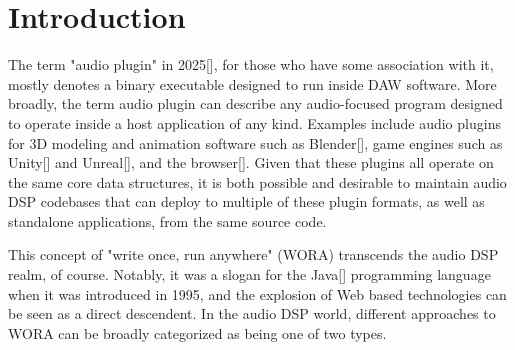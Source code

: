 \documentclass[a4paper]{article}
\title{\papertitle}
\affiliation{
\paperauthorA}
{\href{https://www.mat.ucsb.edu/}{Department of Media Arts \& Technology} \\
\href{https://www.ucsb.edu}{University of California Santa Barbara, USA} \\
{\tt \href{mailto:joel@jaffesd.com}{joel@jaffesd.com}}
}
\newif\ifpdf
\begin{document}
\ifpdf %
  \DeclareGraphicsExtensions{.png,.jpg,.pdf}
\else  %
\fi

\maketitle

\begin{abstract}
This paper introduces a novel plugin architecture, the LPA (Light-weight Plugin Architecture) plugin. 
The development of such an architecture is motivated by the expansive, duplicitous scope of existing audio plugin architectures, which are narrowly focused on deployment in DAW[] software. 
In contrast, the LPA plugin is designed to run in the widest possible variety of contexts, from bare-metal embedded systems to the Web, and everything between, while remaining language agnostic.
This is achieved by limiting the scope of the architecture to strictly perform DSP[] and provide basic parameterized control.
\end{abstract}

\section{Introduction}
\label{sec:intro}

The term "audio plugin" in 2025[], for those who have some association with it, mostly denotes a binary executable designed to run inside DAW software. 
More broadly, the term audio plugin can describe any audio-focused program designed to operate inside a host application of any kind. 
Examples include audio plugins for 3D modeling and animation software such as Blender[], game engines such as Unity[] and Unreal[], and the browser[]. 
Given that these plugins all operate on the same core data structures, it is both possible and desirable to maintain audio DSP codebases that can deploy to multiple of these plugin formats, as well as standalone applications, from the same source code.

This concept of "write once, run anywhere" (WORA) transcends the audio DSP realm, of course. 
Notably, it was a slogan for the Java[] programming language when it was introduced in 1995, and the explosion of Web based technologies can be seen as a direct descendent. 
In the audio DSP world, different approaches to WORA can be broadly categorized as being one of two types.
\end{document}
